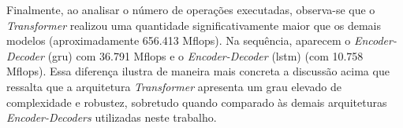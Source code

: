 Finalmente, ao analisar o número de operações executadas, observa-se que o \textit{Transformer} realizou uma quantidade significativamente maior que os demais modelos (aproximadamente 656.413 M\acrshort{flops}). 
Na sequência, aparecem o \textit{Encoder-Decoder} (\acrshort{gru}) com 36.791 M\acrshort{flops} e o \textit{Encoder-Decoder} (\acrshort{lstm}) (com 10.758 M\acrshort{flops}).
Essa diferença ilustra de maneira mais concreta a discussão acima que ressalta que a arquitetura \textit{Transformer} apresenta um grau elevado de complexidade e robustez, sobretudo quando comparado às demais arquiteturas \textit{Encoder-Decoders} utilizadas neste trabalho.
